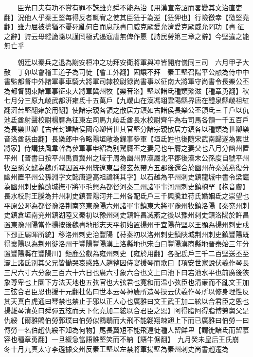 　　臣光曰夫有功不賞有罪不誅雖堯舜不能為治【用漢宣帝詔而畧變其文治直吏翻】況他人乎秦王堅每得反者輒宥之使其臣狃于為逆【狃狎也】行險徼幸【徼堅堯翻】雖力屈被擒猶不憂死亂何自而息哉書曰威克厥愛允濟愛克厥威允罔功【書征之辭】詩云毋縱詭隨以謹罔極式遏寇虐無俾作慝【詩民勞第三章之辭】今堅違之能無亡乎

　　朝廷以秦兵之退為謝安桓冲之功拜安衛將軍與冲皆開府儀同三司　六月甲子大赦　丁卯以會稽王道子為司徒【會工外翻】固讓不拜　秦王堅召陽平公融為侍中中書監都督中外諸軍事車騎大將軍司隸校尉録尚書事以征南大將軍守尚書令長樂公丕為都督關東諸軍事征東大將軍冀州牧【樂音洛】堅以諸氐種類繁滋【種章勇翻】秋七月分三原九嵕武都汧雍氐十五萬戶【九嵕山在漢馮翊雲陽縣界唐在醴泉縣嵕祖紅翻汧苦堅翻雍於用翻】使諸宗親各領之散居方鎮如古諸侯長樂公丕領氐三千戶以仇池氐酋射聲校尉楊膺為征東左司馬九嵕氐酋長水校尉齊午為右司馬各領一千五百戶為長樂世卿【古者封建諸侯國命卿皆世其官堅分諸宗親散居方鎮各以種類為世卿樂音洛酋慈由翻】長樂郎中令略陽垣敞為録事參軍【垣氐姓也後隨宋武南歸遂為累世將家】侍講扶風韋幹為參軍事申紹為别駕膺丕之妻兄也午膺之妻父也八月分幽州置平州【晉書曰按平州禹貢冀州之域于周為幽州界漢屬北平郡後漢末公孫度自號平州牧至孫文懿為魏所㓕因置平州統遼東昌黎玄菟帶方五郡後還合於幽州苻秦滅燕復分幽州置平州公孫淵字文懿唐避高祖諱稱其字】以石越為平州刺史鎮龍城中書令梁讜為幽州刺史鎮薊城撫軍將軍毛興為都督河秦二州諸軍事河州刺史鎮枹罕【枹音膚】長水校尉王騰為并州刺史鎮晉陽河并二州各配氐戶三千興騰並苻氏婚姻氐之崇望也平原公暉為都督豫洛荆南兖東豫陽六州諸軍事鎮東大將軍豫州牧鎮洛陽【秦兖州刺史鎮倉垣南兖州鎮湖陸又秦初以豫州刺史鎮許昌㓕燕之後以豫州刺史鎮洛陽於許昌置東豫州陽當作揚按後魏書地形志天平初始置揚州于宜陽苻堅以王顯為揚州刺史戍下邳正屬暉所統】移洛州刺史治豐陽【苻秦初以洛州刺史鎮陜城荆州刺史鎮豐陽既得襄陽以為荆州徙洛州于豐陽豐陽漢上洛縣地也宋白曰豐陽漢商縣地晉泰始三年分置豐陽縣在豐陽川】鉅鹿公叡為雍州刺史【雍於用翻】各配氐戶三千二百堅送丕至灞上諸氐别其父兄皆慟哭哀感路人趙整因侍宴援琴而歌曰【項安世家說伏羲作琴長三尺六寸六分象三百六十六日也廣六寸象六合也文上曰池下曰宕池水平也前廣後狹象尊卑也上圜下方法天地也五弦官也大弦君也寛和而温小弦臣也清亷而不亂文王加三弦合君臣恩也援干元翻杜佑曰世本云琴神農所造琴操云伏羲作琴所以修身理性反其天真白虎通曰琴禁也禁止于邪以正人心也廣雅曰文王武王加二絃以合君臣之恩也揚雄琴清英曰舜彈五絃而天下化堯加二絃以合君臣之恩】阿得脂阿得脂博勞舅父是仇綏【爾雅鵙伯勞郭璞曰伯勞似鶷鶡而大飛不能翺翔竦翅上下而已廣雅曰伯勞一曰傳勞一名伯趙仇綏不知為何物】尾長翼短不能飛遠徙種人留鮮卑【謂徙諸氐而留慕容也種章勇翻】一旦緩急當語誰堅笑而不納【語牛倨翻】　九月癸未皇后王氏崩　冬十月九真太守李遜據交州反秦王堅以左禁將軍揚壁為秦州刺史尚書趙遷為


